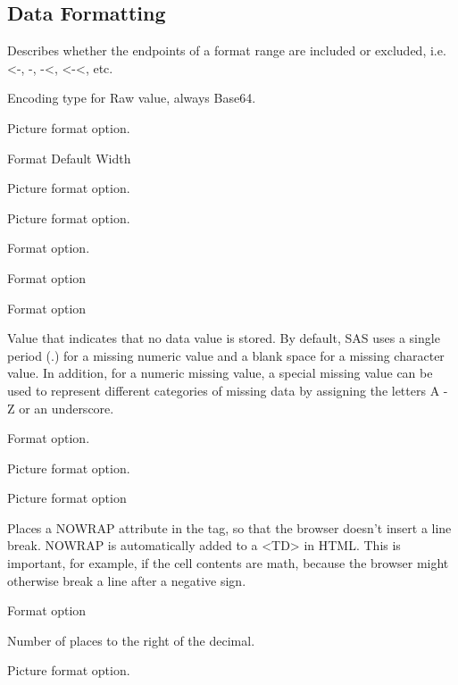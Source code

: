 \subsection{Data Formatting}
\begin{description}

    Describes whether the endpoints of a format range are included or excluded, i.e. <-, -, -<, <-<, etc.


Encoding type for Raw value, always Base64.

Picture format option.

Format Default Width

Picture format option.

Picture format option.

Format option.

Format option

Format option

Value that indicates that no data value is stored. By default, SAS uses a single period (.) for a missing numeric value and a blank space for a missing character value. In addition, for a numeric missing value, a special missing value can be used to represent different categories of missing data by assigning the letters A - Z or an underscore.

Format option.

Picture format option.

Picture format option

Places a NOWRAP attribute in the tag, so that the browser doesn't insert a line break. NOWRAP is automatically added to a <TD> in HTML. This is important, for example, if the cell contents are math, because the browser might otherwise break a line after a negative sign.

Format option

Number of places to the right of the decimal.

Picture format option.


\end{description}
